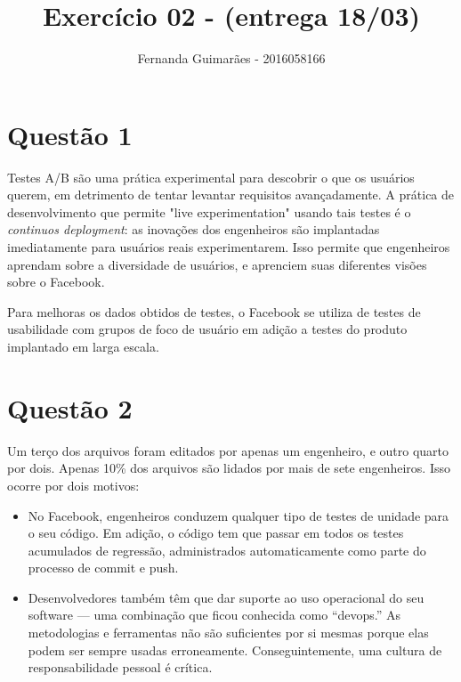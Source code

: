 \documentclass[11pt]{article}
\author{Fernanda Guimarães - 2016058166}
\date{}
\title{Exercício 02 - (entrega 18/03)}
\begin{document}
\maketitle

\section{Questão 1}
\label{sec:orgc97a2cf}
Testes A/B são uma prática experimental para descobrir o que os usuários querem, em
detrimento de tentar levantar requisitos avançadamente. A prática de desenvolvimento que
permite "live experimentation" usando tais testes é o \emph{continuos deployment}: as
inovações dos engenheiros são implantadas imediatamente para usuários reais
experimentarem. Isso permite que engenheiros aprendam sobre a diversidade de usuários, e
aprenciem suas diferentes visões sobre o Facebook.

Para melhoras os dados obtidos de testes, o Facebook se utiliza de testes de usabilidade
com grupos de foco de usuário em adição a testes do produto implantado em larga escala.

\section{Questão 2}
\label{sec:org45ef749}
Um terço dos arquivos foram editados por apenas um engenheiro, e outro quarto por dois.
Apenas 10\% dos arquivos são lidados por mais de sete engenheiros. Isso ocorre por dois
motivos: 
\begin{itemize}
\item No Facebook, engenheiros conduzem qualquer tipo de testes de unidade para o seu
código. Em adição, o código tem que passar em todos os testes acumulados de regressão,
administrados automaticamente como parte do processo de commit e push.
\item Desenvolvedores também têm que dar suporte ao uso operacional do seu software — uma
combinação que ficou conhecida como “devops.” As metodologias e ferramentas não são
suficientes por si mesmas porque elas podem ser sempre usadas
erroneamente. Conseguintemente, uma cultura de responsabilidade pessoal é crítica.
\end{itemize}
\end{document}

